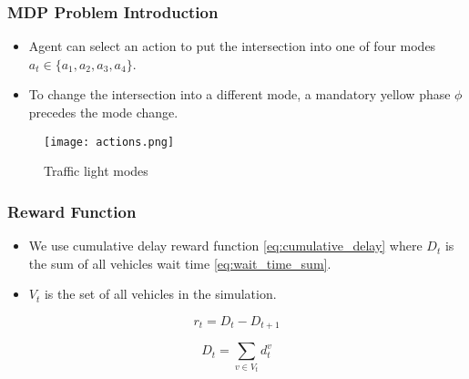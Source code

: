 \documentclass[compress,12pt]{beamer}
\begin{document}

\begin{frame}[bg=arguelles.png]
      \frametitle{MDP Problem Introduction}
      \begin{itemize}
      \item Agent can select an action to put the intersection into one of four modes \(a_t \in \{a_1, a_2, a_3, a_4\}\).
      \item To change the intersection into a different mode, a mandatory yellow phase $\phi$ precedes the mode change.
      \end{itemize}

    \begin{figure}[htbp]
      \centering
      \texttt{[image: actions.png]}
      \caption{Traffic light modes}
      \label{fig:action_space}
    \end{figure}
\end{frame}

\begin{frame}[bg=arguelles.png]
      \frametitle{Reward Function}
      \begin{itemize}
      \item We use cumulative delay reward function \ref{eq:cumulative_delay} where \(D_t\) is the sum of all vehicles wait time \ref{eq:wait_time_sum}\cite{10.3389/frai.2022.805823}.
      \item \(V_t\) is the set of all vehicles in the simulation.
      \end{itemize}

    \begin{equation}
    r_t = D_t - D_{t+1}
    \label{eq:cumulative_delay}
    \end{equation}

    \begin{equation}
    D_t = \sum_{v \in V_t} d_t^v
    \label{eq:wait_time_sum}
    \end{equation}
\end{frame}
\end{document}

